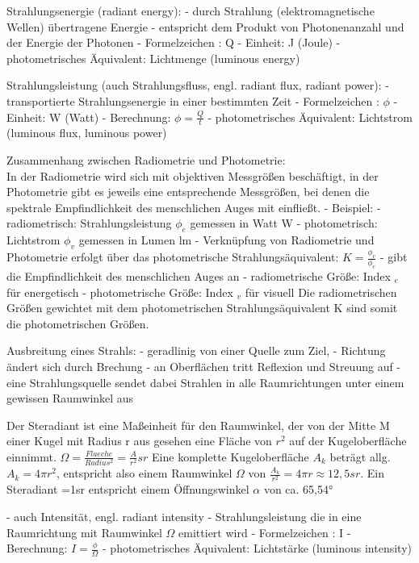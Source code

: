 \documentclass[10pt,landscape]{article}
\begin{document}
\begin{multicols}{3}
  Strahlungsenergie (radiant energy):
  - durch Strahlung (elektromagnetische Wellen) übertragene Energie
  - entspricht dem Produkt von Photonenanzahl und der Energie der Photonen
  - Formelzeichen : Q
  - Einheit: J (Joule)
  - photometrisches Äquivalent: Lichtmenge (luminous energy)
  
  Strahlungsleistung (auch Strahlungsfluss, engl. radiant flux, radiant power):
  - transportierte Strahlungsenergie in einer bestimmten Zeit
  - Formelzeichen : $\phi$
  - Einheit: W (Watt)
  - Berechnung: $\phi = \frac{Q}{t}$
  - photometrisches Äquivalent: Lichtstrom (luminous flux, luminous power)
  
  Zusammenhang zwischen Radiometrie und Photometrie:\\
  In der Radiometrie wird sich mit objektiven Messgrößen beschäftigt, in der Photometrie gibt es jeweils eine entsprechende Messgrößen, bei denen die spektrale Empfindlichkeit des menschlichen Auges mit einfließt.
  - Beispiel:
  - radiometrisch: Strahlungsleistung $\phi_e$ gemessen in Watt W
  - photometrisch: Lichtstrom $\phi_v$ gemessen in Lumen lm
  - Verknüpfung von Radiometrie und Photometrie erfolgt über das photometrische Strahlungsäquivalent: $K =\frac{\phi_v}{\phi_e}$
  - gibt die Empfindlichkeit des menschlichen Auges an
  - radiometrische Größe: Index $_e$ für energetisch
  - photometrische Größe: Index $_v$ für visuell
  Die radiometrischen Größen gewichtet mit dem photometrischen Strahlungsäquivalent K sind somit die photometrischen Größen.
  
  Ausbreitung eines Strahls:
  - geradlinig von einer Quelle zum Ziel,
  - Richtung ändert sich durch Brechung
  - an Oberflächen tritt Reflexion und Streuung auf
  - eine Strahlungsquelle sendet dabei Strahlen in alle Raumrichtungen unter einem gewissen Raumwinkel aus
  
  Der Steradiant ist eine Maßeinheit für den Raumwinkel, der von der Mitte M einer Kugel mit Radius r aus gesehen eine Fläche von $r^2$ auf der Kugeloberfläche einnimmt. $\Omega=\frac{Flaeche}{Radius^2}=\frac{A}{r^2}sr$
  Eine komplette Kugeloberfläche $A_k$ beträgt allg. $A_k = 4\pi r^2$, entspricht also einem Raumwinkel $\Omega$ von $\frac{A_k}{r^2}= 4\pi r\approx 12,5sr$. Ein Steradiant =1sr entspricht einem Öffnungswinkel $\alpha$ von ca. 65,54°
  
  - auch Intensität, engl. radiant intensity
  - Strahlungsleistung die in eine Raumrichtung mit Raumwinkel $\Omega$ emittiert wird
  - Formelzeichen : I
  - Berechnung: $I=\frac{\phi}{\Omega}$
  - photometrisches Äquivalent: Lichtstärke (luminous intensity)
  

\end{multicols}
\end{document}
